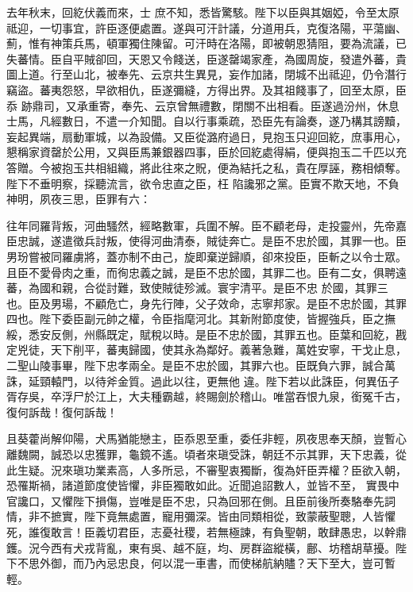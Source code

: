 \begin{pinyinscope}
 去年秋末，回紇伏義而來，士
 庶不知，悉皆驚駭。陛下以臣與其姻婭，令至太原祗迎，一切事宜，許臣逐便處置。遂與可汗計議，分道用兵，克復洛陽，平蕩幽、薊，惟有神策兵馬，頓軍獨住陳留。可汗時在洛陽，即被朝恩猜阻，要為流議，已失蕃情。臣自平賊卻回，天恩又令餞送，臣遂罄竭家產，為國周旋，發遣外蕃，貴圖上道。行至山北，被奉先、云京共生異見，妄作加諸，閉城不出祗迎，仍令潛行竊盜。蕃夷怨怒，早欲相仇，臣遂彌縫，方得出界。及其祖餞事了，回至太原，臣忝
 跡鼎司，又承重寄，奉先、云京曾無禮數，閉關不出相看。臣遂過汾州，休息士馬，凡經數日，不遣一介知聞。自以行事乘疏，恐臣先有論奏，遂乃構其謗黷，妄起異端，扇動軍城，以為設備。又臣從潞府過日，見抱玉只迎回紇，庶事用心，懇稱家資罄於公用，又與臣馬兼銀器四事，臣於回紇處得絹，便與抱玉二千匹以充答贈。今被抱玉共相組織，將此往來之貺，便為結托之私，貴在厚誣，務相傾奪。陛下不垂明察，採聽流言，欲令忠直之臣，枉
 陷讒邪之黨。臣實不欺天地，不負神明，夙夜三思，臣罪有六：



 往年同羅背叛，河曲騷然，經略數軍，兵圍不解。臣不顧老母，走投靈州，先帝嘉臣忠誠，遂遣徵兵討叛，使得河曲清泰，賊徒奔亡。是臣不忠於國，其罪一也。臣男玢嘗被同羅虜將，蓋亦制不由己，旋即棄逆歸順，卻來投臣，臣斬之以令士眾。且臣不愛骨肉之重，而徇忠義之誠，是臣不忠於國，其罪二也。臣有二女，俱聘遠蕃，為國和親，合從討難，致使賊徒殄滅。寰宇清平。是臣不忠
 於國，其罪三也。臣及男瑒，不顧危亡，身先行陣，父子效命，志寧邦家。是臣不忠於國，其罪四也。陛下委臣副元帥之權，令臣指麾河北。其新附節度使，皆握強兵，臣之撫綏，悉安反側，州縣既定，賦稅以時。是臣不忠於國，其罪五也。臣葉和回紇，戡定兇徒，天下削平，蕃夷歸國，使其永為鄰好。義著急難，萬姓安寧，干戈止息，二聖山陵事畢，陛下忠孝兩全。是臣不忠於國，其罪六也。臣既負六罪，誠合萬誅，延頸轅門，以待斧金質。過此以往，更無他
 違。陛下若以此誅臣，何異伍子胥存吳，卒浮尸於江上，大夫種霸越，終賜劍於稽山。唯當吞恨九泉，銜冤千古，復何訴哉！復何訴哉！



 且葵藿尚解仰陽，犬馬猶能戀主，臣忝恩至重，委任非輕，夙夜思奉天顏，豈暫心離魏闕，誠恐以忠獲罪，龜鏡不遙。頃者來瑱受誅，朝廷不示其罪，天下忠義，從此生疑。況來瑱功業素高，人多所忌，不審聖衷獨斷，復為奸臣弄權？臣欲入朝，恐罹斯禍，諸道節度使皆懼，非臣獨敢如此。近聞追詔數人，並皆不至，
 實畏中官讒口，又懼陛下損傷，豈唯是臣不忠，只為回邪在側。且臣前後所奏駱奉先詞情，非不摭實，陛下竟無處置，寵用彌深。皆由同類相從，致蒙蔽聖聰，人皆懼死，誰復敢言！臣義切君臣，志憂社稷，若無極諫，有負聖朝，敢肆愚忠，以幹鼎鑊。況今西有犬戎背亂，東有吳、越不庭，均、房群盜縱橫，鄜、坊稽胡草擾。陛下不思外御，而乃內忌忠良，何以混一車書，而使梯航納贐？天下至大，豈可暫輕。




\end{pinyinscope}
